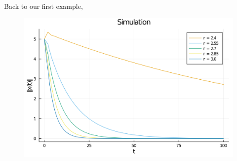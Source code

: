 \documentclass{beamer}
\begin{document}
\begin{frame}
    Back to our first example,
    \begin{figure}
        \includegraphics[width=\linewidth,height=\textheight,keepaspectratio]{../../plots/presentations/dynamics.png}
    \end{figure}
\end{frame}
\end{document}
